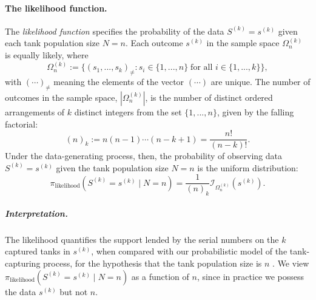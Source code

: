 \documentclass[11pt, oneside]{article}
\begin{document}
\paragraph{The likelihood function.}
The \emph{likelihood function} specifies the probability of the data $S^{(k)}=s^{(k)}$ given each tank population size $N=n$.
Each outcome $s^{(k)}$ in the sample space $\Omega_n^{(k)}$ is equally likely, where
\begin{equation}
	\Omega_n^{(k)} := \{ (s_1, ..., s_k)_{\neq}  :  s_i \in \{1, ..., n\} \; \text{for all } i \in \{ 1,..., k \} \},
\end{equation} with $(\cdots)_{\neq}$ meaning the elements of the vector $(\cdots)$ are unique. 
The number of outcomes in the sample space, $|\Omega_n^{(k)}|$, is the number of distinct ordered arrangements of $k$ distinct integers from the set $\{1,...,n\}$, given by the falling factorial:
\begin{equation}
	(n)_k:= n(n-1)\cdots (n-k+1) = \frac{n!}{(n-k)!}. \label{eq:falling_factorial}
\end{equation}
Under the data-generating process, then, the probability of observing data $S^{(k)}=s^{(k)}$ given the tank population size $N=n$ is the uniform distribution:
\begin{equation}
	\pi_{\text{likelihood}}(S^{(k)}=s^{(k)} \mid N=n)=
	\dfrac{1}{(n)_k} \mathcal{I}_{\Omega_n^{(k)}}\left(s^{(k)}\right).
	\label{eq:dgp}
\end{equation}

\subparagraph{Interpretation.}
The likelihood quantifies the support lended by the serial numbers on the $k$ captured tanks in $s^{(k)}$, when compared with our probabilistic model of the tank-capturing process, for the hypothesis that the tank population size is $n$ \cite{van2021bayesian}. We view $\pi_{\text{likelihood}}(S^{(k)}=s^{(k)} \mid N=n)$ as a function of $n$, since in practice we possess the data $s^{(k)}$ but not $n$.
\end{document}
